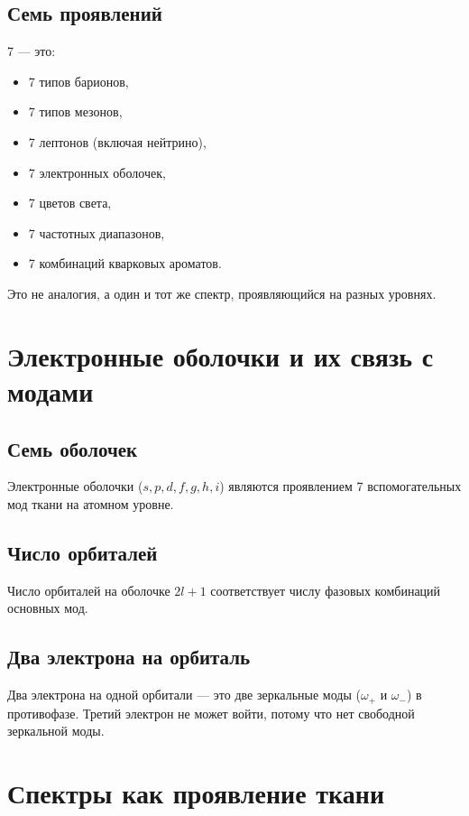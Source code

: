 \documentclass[12pt,a4paper]{article}
\begin{document}
\subsection{Семь проявлений}

7 — это:
\begin{itemize}
\item 7 типов барионов,
\item 7 типов мезонов,
\item 7 лептонов (включая нейтрино),
\item 7 электронных оболочек,
\item 7 цветов света,
\item 7 частотных диапазонов,
\item 7 комбинаций кварковых ароматов.
\end{itemize}

Это не аналогия, а один и тот же спектр, проявляющийся на разных уровнях.

\section{Электронные оболочки и их связь с модами}

\subsection{Семь оболочек}

Электронные оболочки (\(s, p, d, f, g, h, i\)) являются проявлением 7 вспомогательных мод ткани на атомном уровне.

\subsection{Число орбиталей}

Число орбиталей на оболочке \(2l+1\) соответствует числу фазовых комбинаций основных мод.

\subsection{Два электрона на орбиталь}

Два электрона на одной орбитали — это две зеркальные моды (\(\omega_{+}\) и \(\omega_{-}\)) в противофазе. Третий электрон не может войти, потому что нет свободной зеркальной моды.

\section{Спектры как проявление ткани}
\end{document}
